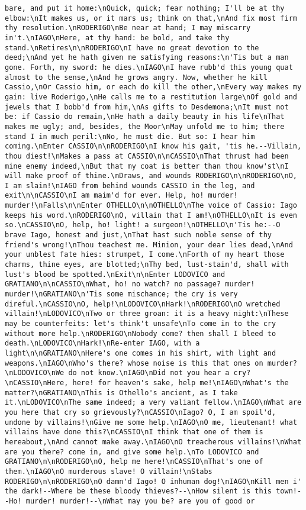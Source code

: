 \begin{verbatim}
bare, and put it home:\nQuick, quick; fear nothing; I'll be at thy elbow:\nIt makes us, or it mars us; think on that,\nAnd fix most firm thy resolution.\nRODERIGO\nBe near at hand; I may miscarry in't.\nIAGO\nHere, at thy hand: be bold, and take thy stand.\nRetires\n\nRODERIGO\nI have no great devotion to the deed;\nAnd yet he hath given me satisfying reasons:\n'Tis but a man gone. Forth, my sword: he dies.\nIAGO\nI have rubb'd this young quat almost to the sense,\nAnd he grows angry. Now, whether he kill Cassio,\nOr Cassio him, or each do kill the other,\nEvery way makes my gain: live Roderigo,\nHe calls me to a restitution large\nOf gold and jewels that I bobb'd from him,\nAs gifts to Desdemona;\nIt must not be: if Cassio do remain,\nHe hath a daily beauty in his life\nThat makes me ugly; and, besides, the Moor\nMay unfold me to him; there stand I in much peril:\nNo, he must die. But so: I hear him coming.\nEnter CASSIO\n\nRODERIGO\nI know his gait, 'tis he.--Villain, thou diest!\nMakes a pass at CASSIO\n\nCASSIO\nThat thrust had been mine enemy indeed,\nBut that my coat is better than thou know'st\nI will make proof of thine.\nDraws, and wounds RODERIGO\n\nRODERIGO\nO, I am slain!\nIAGO from behind wounds CASSIO in the leg, and exit\n\nCASSIO\nI am maim'd for ever. Help, ho! murder! murder!\nFalls\n\nEnter OTHELLO\n\nOTHELLO\nThe voice of Cassio: Iago keeps his word.\nRODERIGO\nO, villain that I am!\nOTHELLO\nIt is even so.\nCASSIO\nO, help, ho! light! a surgeon!\nOTHELLO\n'Tis he:--O brave Iago, honest and just,\nThat hast such noble sense of thy friend's wrong!\nThou teachest me. Minion, your dear lies dead,\nAnd your unblest fate hies: strumpet, I come.\nForth of my heart those charms, thine eyes, are blotted;\nThy bed, lust-stain'd, shall with lust's blood be spotted.\nExit\n\nEnter LODOVICO and GRATIANO\n\nCASSIO\nWhat, ho! no watch? no passage? murder! murder!\nGRATIANO\n'Tis some mischance; the cry is very direful.\nCASSIO\nO, help!\nLODOVICO\nHark!\nRODERIGO\nO wretched villain!\nLODOVICO\nTwo or three groan: it is a heavy night:\nThese may be counterfeits: let's think't unsafe\nTo come in to the cry without more help.\nRODERIGO\nNobody come? then shall I bleed to death.\nLODOVICO\nHark!\nRe-enter IAGO, with a light\n\nGRATIANO\nHere's one comes in his shirt, with light and weapons.\nIAGO\nWho's there? whose noise is this that ones on murder?\nLODOVICO\nWe do not know.\nIAGO\nDid not you hear a cry?\nCASSIO\nHere, here! for heaven's sake, help me!\nIAGO\nWhat's the matter?\nGRATIANO\nThis is Othello's ancient, as I take it.\nLODOVICO\nThe same indeed; a very valiant fellow.\nIAGO\nWhat are you here that cry so grievously?\nCASSIO\nIago? O, I am spoil'd, undone by villains!\nGive me some help.\nIAGO\nO me, lieutenant! what villains have done this?\nCASSIO\nI think that one of them is hereabout,\nAnd cannot make away.\nIAGO\nO treacherous villains!\nWhat are you there? come in, and give some help.\nTo LODOVICO and GRATIANO\n\nRODERIGO\nO, help me here!\nCASSIO\nThat's one of them.\nIAGO\nO murderous slave! O villain!\nStabs RODERIGO\n\nRODERIGO\nO damn'd Iago! O inhuman dog!\nIAGO\nKill men i' the dark!--Where be these bloody thieves?--\nHow silent is this town!--Ho! murder! murder!--\nWhat may you be? are you of good or 
\end{verbatim}
